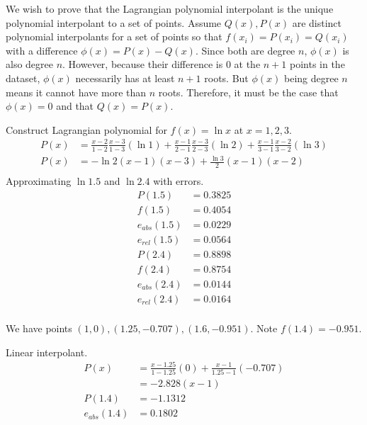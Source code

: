 \documentclass{homework}
\begin{document}
\maketitle

\question
We wish to prove that the Lagrangian polynomial interpolant is the unique polynomial interpolant to a set of points. Assume $Q(x), P(x)$ are distinct polynomial interpolants for a set of points so that $f(x_i) = P(x_i) = Q(x_i)$ with a difference $\phi(x) = P(x) - Q(x)$. Since both are degree $n$, $\phi(x)$ is also degree $n$. However, because their difference is 0 at the $n+1$ points in the dataset, $\phi(x)$ necessarily has at least $n+1$ roots. But $\phi(x)$ being degree $n$ means it cannot have more than $n$ roots. Therefore, it must be the case that $\phi(x) = 0$ and that $Q(x) = P(x)$.

\question
Construct Lagrangian polynomial for $f(x) = \ln x$ at $x = 1, 2, 3$.
\begin{align*}
	P(x)	&=
	\frac{x-2}{1-2} \frac{x-3}{1-3} (\ln 1) + 
	\frac{x-1}{2-1} \frac{x-3}{2-3} (\ln 2) + 
	\frac{x-1}{3-1} \frac{x-2}{3-2} (\ln 3) \\
	P(x)	&= \boxed{-\ln 2 (x-1)(x-3) + \frac{\ln 3}{2} (x-1)(x-2)} \\
\end{align*}
Approximating $\ln 1.5$ and $\ln 2.4$ with errors.
\begin{align*}
	P(1.5)	&=	0.3825	\\
	f(1.5)	&=	0.4054	\\
	e_{abs}(1.5)	&=	0.0229	\\
	e_{rel}(1.5)	&=	0.0564	\\
	P(2.4)	&=	0.8898	\\
	f(2.4)	&=	0.8754	\\
	e_{abs}(2.4)	&=	0.0144	\\
	e_{rel}(2.4)	&=	0.0164	\\
\end{align*}

\question
We have points $(1, 0), (1.25, -0.707), (1.6, -0.951)$. Note $f(1.4) = -0.951$.

Linear interpolant.
\begin{align*}
	P(x)	&= \frac{x-1.25}{1-1.25}(0) + \frac{x-1}{1.25-1}(-0.707)	\\
	&=	\boxed{-2.828(x-1)}	\\
	P(1.4)	&=	-1.1312	\\
	e_{abs}(1.4)	&=	0.1802	\\
\end{align*}
\end{document}
